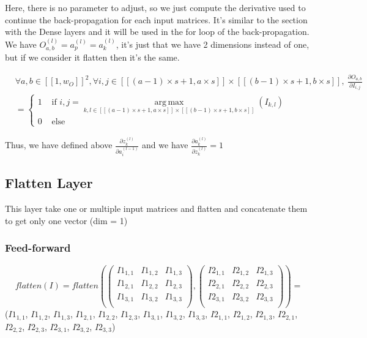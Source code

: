 \documentclass[11pt,a4paper]{report}
\DeclareMathOperator*{\argmax}{arg\,max}
\begin{document}
Here, there is no parameter to adjust, so we just compute the derivative used to continue the back-propagation for each input matrices.
It's similar to the section with the Dense layers and it will be used in the for loop of the back-propagation. We have $O_{a,b}^{(l)} = a_p^{(l)} = a_k^{(l)}$, it's just that we have 2 dimensions instead of one, but if we consider it flatten then it's the same.

\begin{equation}
\begin{split}
    &\forall a,b \in [\![1,w_O]\!]^2, \forall i,j \in [\![(a-1)\times s + 1,a\times s]\!] \times [\![(b-1)\times s + 1,b\times s]\!],\ \frac{\partial O_{a,b}}{\partial I_{i,j}}\\
    &= \begin{cases}
        1 &\text{ if } i,j = \argmax\limits_{k,l \in [\![(a-1)\times s + 1,a\times s]\!] \times [\![(b-1)\times s + 1,b\times s]\!]}(I_{k,l})\\
        0 &\text{ else}
    \end{cases}
\end{split}
\end{equation}

Thus, we have defined above $\frac{\partial z_k^{(l)}}{\partial a_i^{(l-1)}}$ and we have $\frac{\partial a_k^{(l)}}{\partial z_k^{(l)}} = 1$

\newpage
\subsection{Flatten Layer}

This layer take one or multiple input matrices and flatten and concatenate them to get only one vector (dim = 1)

\subsubsection{Feed-forward}

\begin{equation}
flatten(I) = flatten\left(\begin{pmatrix}
I1_{1,1} & I1_{1,2} & I1_{1,3} \\
I1_{2,1} & I1_{2,2} & I1_{2,3} \\
I1_{3,1} & I1_{3,2} & I1_{3,3} \\
\end{pmatrix},\begin{pmatrix}
I2_{1,1} & I2_{1,2} & I2_{1,3} \\
I2_{2,1} & I2_{2,2} & I2_{2,3} \\
I2_{3,1} & I2_{3,2} & I2_{3,3} \\
\end{pmatrix}\right)
=\end{equation}
($I1_{1,1}$, $I1_{1,2}$, $I1_{1,3}$, $I1_{2,1}$, $I1_{2,2}$, $I1_{2,3}$, $I1_{3,1}$, $I1_{3,2}$, $I1_{3,3}$, $I2_{1,1}$, $I2_{1,2}$, $I2_{1,3}$, $I2_{2,1}$, $I2_{2,2}$, $I2_{2,3}$, $I2_{3,1}$, $I2_{3,2}$, $I2_{3,3}$)
\end{document}
